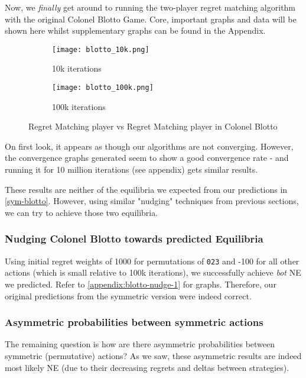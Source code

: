 \documentclass [11pt]{article}
\begin{document}
Now, we \textit{finally} get around to running the two-player regret matching algorithm with the original Colonel Blotto Game. Core, important graphs and data will be shown here whilst supplementary graphs can be found in the Appendix.

\begin{figure}[H]
  \centering
  \begin{subfigure}[b]{0.45\textwidth}
    \centering
    \texttt{[image: blotto\_10k.png]}
    \caption{10k iterations}
  \end{subfigure}
  \begin{subfigure}[b]{0.45\textwidth}
    \centering
    \texttt{[image: blotto\_100k.png]}
    \caption{100k iterations}
  \end{subfigure}

  \caption{Regret Matching player vs Regret Matching player in Colonel Blotto}
\end{figure}

On first look, it appears as though our algorithms are not converging. However, the convergence graphs generated seem to show a good convergence rate - and running it for 10 million iterations (see appendix) gets similar results.

These results are neither of the equilibria we expected from our predictions in \ref{sym-blotto}. However, using similar "nudging" techniques from previous sections, we can try to achieve those two equilibria.

\subsubsection{Nudging Colonel Blotto towards predicted Equilibria}

Using initial regret weights of 1000 for permutations of \texttt{023} and -100 for all other actions (which is small relative to 100k iterations), we successfully achieve \textit{bot} NE we predicted. Refer to \ref{appendix:blotto-nudge-1} for graphs. Therefore, our original predictions from the symmetric version were indeed correct.

\subsubsection{Asymmetric probabilities between symmetric actions}

The remaining question is how are there asymmetric probabilities between symmetric (permutative) actions? As we saw, these asymmetric results are indeed most likely NE (due to their decreasing regrets and deltas between strategies).
\end{document}
